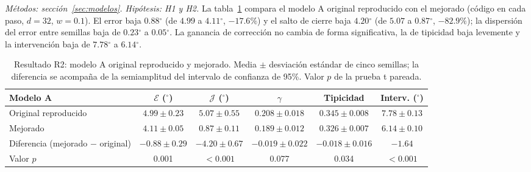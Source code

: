\documentclass[11pt,a4paper]{article}
\newcommand{\gr}{$^{\circ}$}
\begin{document}
\textit{Métodos: sección~\ref{sec:modelos}. Hipótesis: H1 y H2.} La tabla~\ref{tab:A} compara el modelo A original reproducido con el mejorado (código en cada paso, $d=32$, $w=0.1$). El error baja $0.88$\gr{} (de $4.99$ a $4.11$\gr, $-17.6\%$) y el salto de cierre baja $4.20$\gr{} (de $5.07$ a $0.87$\gr, $-82.9\%$); la dispersión del error entre semillas baja de $0.23$\gr{} a $0.05$\gr. La ganancia de corrección no cambia de forma significativa, la de tipicidad baja levemente y la intervención baja de $7.78$\gr{} a $6.14$\gr.

\begin{table}[h]
\centering\small
\setlength{\tabcolsep}{3pt}
\begin{tabular}{lccccc}
\toprule
Modelo A & $\mathcal E$ (\gr) & $\mathcal J$ (\gr) & $\gamma$ & Tipicidad & Interv. (\gr) \\
\midrule
Original reproducido & $4.99\pm0.23$ & $5.07\pm0.55$ & $0.208\pm0.018$ & $0.345\pm0.008$ & $7.78\pm0.13$ \\
Mejorado & $4.11\pm0.05$ & $0.87\pm0.11$ & $0.189\pm0.012$ & $0.326\pm0.007$ & $6.14\pm0.10$ \\
Diferencia (mejorado $-$ original) & $-0.88\pm0.29$ & $-4.20\pm0.67$ & $-0.019\pm0.022$ & $-0.018\pm0.016$ & $-1.64$ \\
Valor $p$ & 0.001 & $<0.001$ & 0.077 & 0.034 & $<0.001$ \\
\bottomrule
\end{tabular}
\caption{Resultado R2: modelo A original reproducido y mejorado. Media $\pm$ desviación estándar de cinco semillas; la diferencia se acompaña de la semiamplitud del intervalo de confianza de 95\%. Valor $p$ de la prueba t pareada.}
\label{tab:A}
\end{table}
\end{document}

